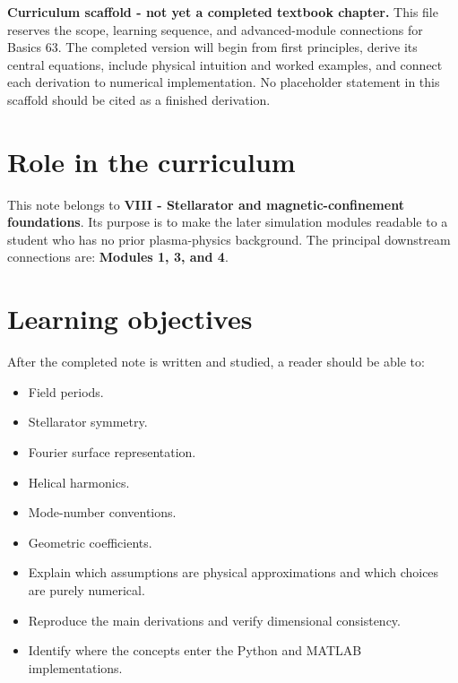 \documentclass[11pt]{article}
\begin{document}

\begin{overviewbox}
\textbf{Curriculum scaffold - not yet a completed textbook chapter.} This file reserves the scope, learning sequence, and advanced-module connections for Basics 63. The completed version will begin from first principles, derive its central equations, include physical intuition and worked examples, and connect each derivation to numerical implementation. No placeholder statement in this scaffold should be cited as a finished derivation.
\end{overviewbox}

\ProjectTOC

\section{Role in the curriculum}
This note belongs to \textbf{VIII - Stellarator and magnetic-confinement foundations}. Its purpose is to make the later simulation modules readable to a student who has no prior plasma-physics background. The principal downstream connections are: \textbf{Modules 1, 3, and 4}.

\section{Learning objectives}
After the completed note is written and studied, a reader should be able to:
\begin{itemize}[leftmargin=1.6em]
\item Field periods.
\item Stellarator symmetry.
\item Fourier surface representation.
\item Helical harmonics.
\item Mode-number conventions.
\item Geometric coefficients.
\item Explain which assumptions are physical approximations and which choices are purely numerical.
\item Reproduce the main derivations and verify dimensional consistency.
\item Identify where the concepts enter the Python and MATLAB implementations.
\end{itemize}
\end{document}

